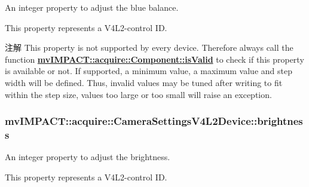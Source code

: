 An integer property to adjust the blue balance. 

This property represents a V4\+L2-\/control I\+D.

\begin{DoxyNote}{注解}
This property is not supported by every device. Therefore always call the function {\bfseries \hyperlink{classmv_i_m_p_a_c_t_1_1acquire_1_1_component_ac51e55e7e046101f3c6119d84123abd5}{mv\+I\+M\+P\+A\+C\+T\+::acquire\+::\+Component\+::is\+Valid}} to check if this property is available or not. If supported, a minimum value, a maximum value and step width will be defined. Thus, invalid values may be tuned after writing to fit within the step size, values too large or too small will raise an exception. 
\end{DoxyNote}
\hypertarget{classmv_i_m_p_a_c_t_1_1acquire_1_1_camera_settings_v4_l2_device_a6d51dc2a6441671cc8c5c4ba0cded763}{
\subsubsection[{brightness}]{ mv\+I\+M\+P\+A\+C\+T\+::acquire\+::\+Camera\+Settings\+V4\+L2\+Device\+::brightness}}\label{classmv_i_m_p_a_c_t_1_1acquire_1_1_camera_settings_v4_l2_device_a6d51dc2a6441671cc8c5c4ba0cded763}


An integer property to adjust the brightness. 

This property represents a V4\+L2-\/control I\+D.

